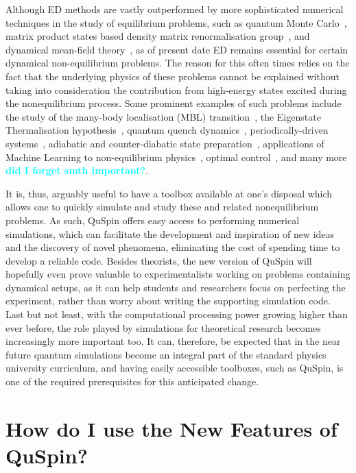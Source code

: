 \documentclass{SciPost}
\newcommand\0{\scalebox{-1}[1]{0}}
\newcommand*{\cyan}{\textcolor{cyan}}
\begin{document}
Although ED methods are vastly outperformed by more sophisticated numerical techniques in the study of equilibrium problems, such as quantum Monte Carlo~\cite{pollet_12,foulkes_01,acioli_97}, matrix product states based density matrix renormalisation group~\cite{daley_04,schollwock_05,schollwock_11}, and dynamical mean-field theory~\cite{georges_96,kotliar_06,aoki_14}, as of present date ED remains essential for certain dynamical non-equilibrium problems. The reason for this often times relies on the fact that the underlying physics of these problems cannot be explained without taking into consideration the contribution from high-energy states excited during the nonequilibrium process. Some prominent examples of such problems include the study of the many-body localisation (MBL) transition~\cite{nandkishore_15,abanin_17}, the Eigenstate Thermalisation hypothesis~\cite{TD_review}, quantum quench dynamics~\cite{polkovnikov_11}, periodically-driven systems~\cite{goldman_14,bukov_review,eckardt_17}, adiabatic and counter-diabatic state preparation~\cite{kolodrubetz_17}, applications of Machine Learning to non-equilibrium physics~\cite{chen_14,bukov_17RL,dunjko_17}, optimal control~\cite{glaser_15}, and many more \cyan{\bf did I forget smth important?}.

It is, thus, arguably useful to have a toolbox available at one's disposal which allows one to quickly simulate and study these and related nonequilibrium problems. As such, QuSpin offers easy access to performing numerical simulations, which can facilitate the development and inspiration of new ideas and the discovery of novel phenomena, eliminating the cost of spending time to develop a reliable code. Besides theorists, the new version of QuSpin will hopefully even prove valuable to experimentalists working on problems containing dynamical setups, as it can help students and researchers focus on perfecting the experiment, rather than worry about writing the supporting simulation code. Last but not least, with the computational processing power growing higher than ever before, the role played by simulations for theoretical research becomes increasingly more important too. It can, therefore, be expected that in the near future quantum simulations become an integral part of the standard physics university curriculum, and having easily accessible toolboxes, such as QuSpin, is one of the required prerequisites for this anticipated change.


\section{How do I use the New Features of QuSpin?}
\label{sec:examples}
\end{document}
